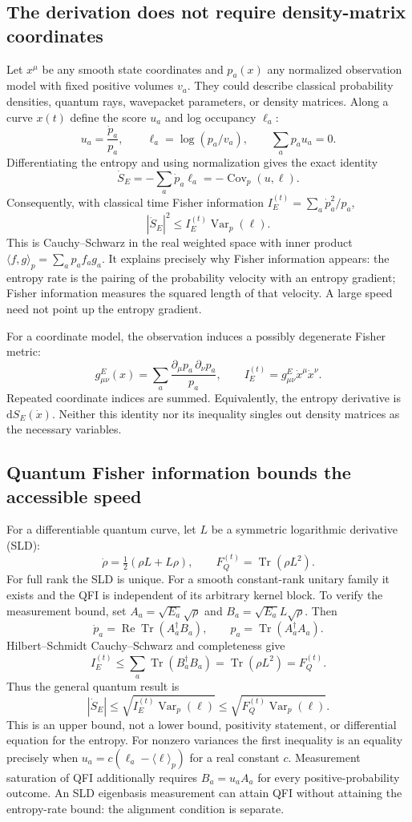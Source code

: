 \documentclass[11pt,a4paper]{article}
\DeclareMathOperator{\Tr}{Tr}
\DeclareMathOperator{\Var}{Var}
\DeclareMathOperator{\Cov}{Cov}
\newcommand{\dd}{\mathrm{d}}
\begin{document}
\subsection{The derivation does not require density-matrix coordinates}
Let $x^\mu$ be any smooth state coordinates and $p_a(x)$ any normalized observation model with fixed positive volumes $v_a$. They could describe classical probability densities, quantum rays, wavepacket parameters, or density matrices. Along a curve $x(t)$ define the score $u_a$ and log occupancy $\ell_a$:
\[u_a=\frac{\dot p_a}{p_a},\qquad\ell_a=\log(p_a/v_a),\qquad\sum_a p_au_a=0.\]
Differentiating the entropy and using normalization gives the exact identity
\[\dot S_E=-\sum_a\dot p_a\ell_a=-\Cov_p(u,\ell).\]
Consequently, with classical time Fisher information $I_E^{(t)}=\sum_a\dot p_a^2/p_a$,
\[\boxed{|\dot S_E|^2\le I_E^{(t)}\Var_p(\ell).}\]
This is Cauchy--Schwarz in the real weighted space with inner product $\langle f,g\rangle_p=\sum_ap_af_ag_a$. It explains precisely why Fisher information appears: the entropy rate is the pairing of the probability velocity with an entropy gradient; Fisher information measures the squared length of that velocity. A large speed need not point up the entropy gradient.

For a coordinate model, the observation induces a possibly degenerate Fisher metric:
\[g^E_{\mu\nu}(x)=\sum_a\frac{\partial_\mu p_a\,\partial_\nu p_a}{p_a},\qquad I_E^{(t)}=g^E_{\mu\nu}\dot x^\mu\dot x^\nu.\]
Repeated coordinate indices are summed. Equivalently, the entropy derivative is $\dd S_E(\dot x)$. Neither this identity nor its inequality singles out density matrices as the necessary variables.

\subsection{Quantum Fisher information bounds the accessible speed}
For a differentiable quantum curve, let $L$ be a symmetric logarithmic derivative (SLD):
\[\dot\rho=\tfrac12(\rho L+L\rho),\qquad F_Q^{(t)}=\Tr(\rho L^2).\]
For full rank the SLD is unique. For a smooth constant-rank unitary family it exists and the QFI is independent of its arbitrary kernel block. To verify the measurement bound, set $A_a=\sqrt{E_a}\sqrt{\rho}$ and $B_a=\sqrt{E_a}L\sqrt{\rho}$. Then
\[\dot p_a=\operatorname{Re}\Tr(A_a^\dagger B_a),\qquad p_a=\Tr(A_a^\dagger A_a).\]
Hilbert--Schmidt Cauchy--Schwarz and completeness give
\[I_E^{(t)}\le\sum_a\Tr(B_a^\dagger B_a)=\Tr(\rho L^2)=F_Q^{(t)}.\]
Thus the general quantum result is
\[\boxed{|\dot S_E|\le\sqrt{I_E^{(t)}\Var_p(\ell)}\le\sqrt{F_Q^{(t)}\Var_p(\ell)}.}\]
This is an upper bound, not a lower bound, positivity statement, or differential equation for the entropy. For nonzero variances the first inequality is an equality precisely when $u_a=c(\ell_a-\langle\ell\rangle_p)$ for a real constant $c$. Measurement saturation of QFI additionally requires $B_a=u_aA_a$ for every positive-probability outcome. An SLD eigenbasis measurement can attain QFI without attaining the entropy-rate bound: the alignment condition is separate.
\end{document}
